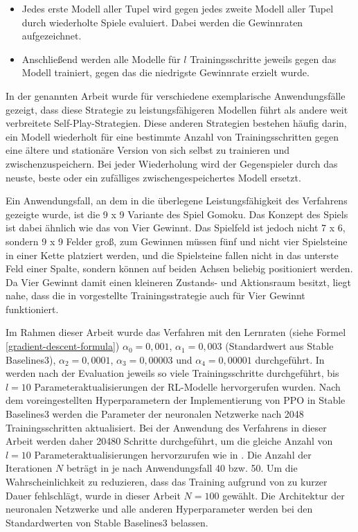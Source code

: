 \begin{itemize}
	\item Jedes erste Modell aller Tupel wird gegen jedes zweite Modell aller Tupel durch wiederholte Spiele evaluiert. Dabei werden die Gewinnraten aufgezeichnet.
	\item Anschließend werden alle Modelle für $l$ Trainingsschritte jeweils gegen das Modell trainiert, gegen das die niedrigste Gewinnrate erzielt wurde.
\end{itemize}

In der genannten Arbeit wurde für verschiedene exemplarische Anwendungsfälle gezeigt, dass diese Strategie zu leistungsfähigeren Modellen führt als andere weit verbreitete Self-Play-Strategien. Diese anderen Strategien bestehen häufig darin, ein Modell wiederholt für eine bestimmte Anzahl von Trainingsschritten gegen eine ältere und stationäre Version von sich selbst zu trainieren und zwischenzuspeichern. Bei jeder Wiederholung wird der Gegenspieler durch das neuste, beste oder ein zufälliges zwischengespeichertes Modell ersetzt.

Ein Anwendungsfall, an dem in \cite{Zhong.2020} die überlegene Leistungsfähigkeit des Verfahrens gezeigte wurde, ist die 9 x 9 Variante des Spiel Gomoku. Das Konzept des Spiels ist dabei ähnlich wie das von Vier Gewinnt. Das Spielfeld ist jedoch nicht 7 x 6, sondern 9 x 9 Felder groß, zum Gewinnen müssen fünf und nicht vier Spielsteine in einer Kette platziert werden, und die Spielsteine fallen nicht in das unterste Feld einer Spalte, sondern können auf beiden Achsen beliebig positioniert werden. Da Vier Gewinnt damit einen kleineren Zustands- und Aktionsraum besitzt, liegt nahe, dass die in \cite{Zhong.2020} vorgestellte Trainingsstrategie auch für Vier Gewinnt funktioniert.


Im Rahmen dieser Arbeit wurde das Verfahren mit den Lernraten (siehe Formel \ref{gradient-descent-formula}) $\alpha_0 = 0,001$, $\alpha_1 = 0,003$ (Standardwert aus Stable Baselines3), $\alpha_2 = 0,0001$, $\alpha_3 = 0,00003$ und $\alpha_4 = 0,00001$ durchgeführt. In \cite{Zhong.2020} werden nach der Evaluation jeweils so viele Trainingsschritte durchgeführt, bis $l = 10$ Parameteraktualisierungen der RL-Modelle hervorgerufen wurden. Nach dem voreingestellten Hyperparametern der Implementierung von PPO in Stable Baselines3 werden die Parameter der neuronalen Netzwerke nach 2048 Trainingsschritten aktualisiert. Bei der Anwendung des Verfahrens in dieser Arbeit werden daher 20480 Schritte durchgeführt, um die gleiche Anzahl von $l = 10$ Parameteraktualisierungen hervorzurufen wie in \cite{Zhong.2020}. Die Anzahl der Iterationen $N$ beträgt in \cite{Zhong.2020} je nach Anwendungsfall 40 bzw. 50. Um die Wahrscheinlichkeit zu reduzieren, dass das Training aufgrund von zu kurzer Dauer fehlschlägt, wurde in dieser Arbeit $N = 100$ gewählt. Die Architektur der neuronalen Netzwerke und alle anderen Hyperparameter werden bei den Standardwerten von Stable Baselines3 belassen.

